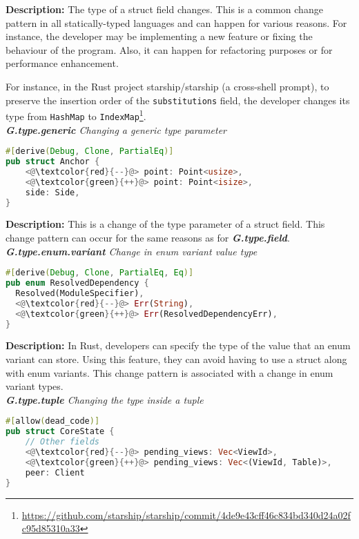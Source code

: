 \noindent\textbf{Description:} The type of a struct field changes. This is a common change pattern in all statically-typed languages and can happen for various reasons. For instance, the developer may be implementing a new feature or fixing the behaviour of the program. Also, it can happen for refactoring purposes or for performance enhancement. 

For instance, in the Rust project starship/starship (a cross-shell prompt), to preserve the insertion order of the \verb+substitutions+ field, the developer changes its type from \verb+HashMap+ to \verb+IndexMap+\footnote{\url{https://github.com/starship/starship/commit/4de9e43cff46c834bd340d24a02fc95d85310a33}}.
\\

\noindent\textit{\textbf{G.type.generic} Changing a generic type parameter}

\begin{lstlisting}[language=Rust, style=colouredRust]
#[derive(Debug, Clone, PartialEq)]
pub struct Anchor {
    <@\textcolor{red}{--}@> point: Point<usize>,
    <@\textcolor{green}{++}@> point: Point<isize>,
    side: Side,
}

\end{lstlisting}

\noindent\textbf{Description:} This is a change of the type parameter of a struct field. This change pattern can occur for the same reasons as for \textit{\textbf{G.type.field}}. \\

\noindent\textit{\textbf{G.type.enum.variant} Change in enum variant value type}

\begin{lstlisting}[language=Rust, style=colouredRust]
#[derive(Debug, Clone, PartialEq, Eq)]
pub enum ResolvedDependency {
  Resolved(ModuleSpecifier),
  <@\textcolor{red}{--}@> Err(String),
  <@\textcolor{green}{++}@> Err(ResolvedDependencyErr),
}

\end{lstlisting}

\noindent\textbf{Description:} In Rust, developers can specify the type of the value that an enum variant can store. Using this feature, they can avoid having to use a struct along with enum variants. This change pattern is associated with a change in enum variant types. \\


\noindent\textit{\textbf{G.type.tuple} Changing the type inside a tuple}

\begin{lstlisting}[language=Rust, style=colouredRust]
#[allow(dead_code)]
pub struct CoreState {
    // Other fields
    <@\textcolor{red}{--}@> pending_views: Vec<ViewId>,
    <@\textcolor{green}{++}@> pending_views: Vec<(ViewId, Table)>,
    peer: Client
}
\end{lstlisting}




